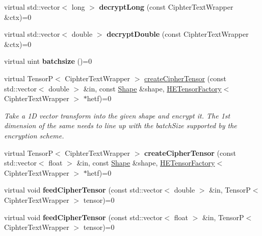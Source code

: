 \begin{DoxyCompactItemize}
virtual std\+::vector$<$ long $>$ {\bfseries decrypt\+Long} (const Ciphter\+Text\+Wrapper \&ctx)=0
\item 
\mbox{\label{classCipherTextWrapperFactory_a3f82164d98d194f357f35bb556f53a88}} 
virtual std\+::vector$<$ double $>$ {\bfseries decrypt\+Double} (const Ciphter\+Text\+Wrapper \&ctx)=0
\item 
\mbox{\label{classCipherTextWrapperFactory_aabc9d4f37f99a4af26f7489507bbedaa}} 
virtual uint {\bfseries batchsize} ()=0
\item 
\mbox{\label{classCipherTextWrapperFactory_a3789f51224da4d299c25c506848ef224}} 
virtual TensorP$<$ Ciphter\+Text\+Wrapper $>$ \hyperlink{classCipherTextWrapperFactory_a3789f51224da4d299c25c506848ef224}{create\+Cipher\+Tensor} (const std\+::vector$<$ double $>$ \&in, const \hyperlink{classShape}{Shape} \&shape, \hyperlink{classHETensorFactory}{H\+E\+Tensor\+Factory}$<$ Ciphter\+Text\+Wrapper $>$ $\ast$hetf)=0
\begin{DoxyCompactList}\small\item\em Take a 1D vector transform into the given shape and encrypt it. The 1st dimension of the same needs to line up with the batch\+Size supported by the encryption scheme. \end{DoxyCompactList}\item 
\mbox{\label{classCipherTextWrapperFactory_adeb6353a9a9422b1fbb9c81fd10460f6}} 
virtual TensorP$<$ Ciphter\+Text\+Wrapper $>$ {\bfseries create\+Cipher\+Tensor} (const std\+::vector$<$ float $>$ \&in, const \hyperlink{classShape}{Shape} \&shape, \hyperlink{classHETensorFactory}{H\+E\+Tensor\+Factory}$<$ Ciphter\+Text\+Wrapper $>$ $\ast$hetf)=0
\item 
\mbox{\label{classCipherTextWrapperFactory_ae751664fea4b4a35b8ace79c11516e14}} 
virtual void {\bfseries feed\+Cipher\+Tensor} (const std\+::vector$<$ double $>$ \&in, TensorP$<$ Ciphter\+Text\+Wrapper $>$ tensor)=0
\item 
\mbox{\label{classCipherTextWrapperFactory_af31fa14e76c55c298985dcbeb3536416}} 
virtual void {\bfseries feed\+Cipher\+Tensor} (const std\+::vector$<$ float $>$ \&in, TensorP$<$ Ciphter\+Text\+Wrapper $>$ tensor)=0

\end{DoxyCompactItemize}
